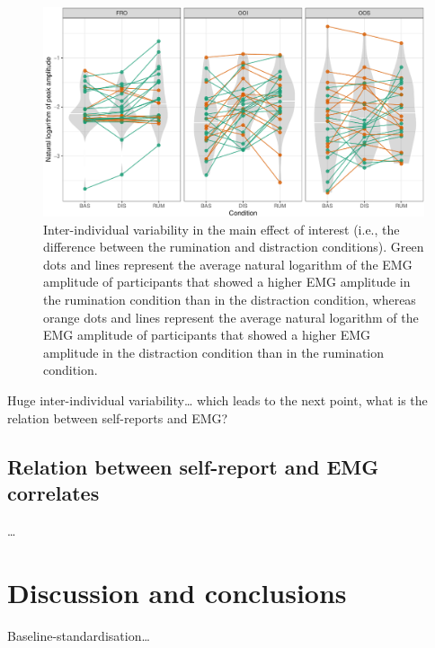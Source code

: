 \documentclass[
  english,
  man,floatsintext]{apa6}
\begin{document}
\begin{figure}[!htb]

{\centering \includegraphics[width=1\linewidth]{manuscript_files/figure-latex/everyone-1} 

}

\caption{Inter-individual variability in the main effect of interest (i.e., the difference between the rumination and distraction conditions). Green dots and lines represent the average natural logarithm of the EMG amplitude of participants that showed a higher EMG amplitude in the rumination condition than in the distraction condition, whereas orange dots and lines represent the average natural logarithm of the EMG amplitude of participants that showed a higher EMG amplitude in the distraction condition than in the rumination condition.}\label{fig:everyone}
\end{figure}

Huge inter-individual variability\ldots{} which leads to the next point, what is the relation between self-reports and EMG?

\hypertarget{relation-between-self-report-and-emg-correlates}{%
\subsection{Relation between self-report and EMG correlates}\label{relation-between-self-report-and-emg-correlates}}

\ldots{}

\hypertarget{discussion-and-conclusions}{%
\section{Discussion and conclusions}\label{discussion-and-conclusions}}

Baseline-standardisation\ldots{}
\end{document}
